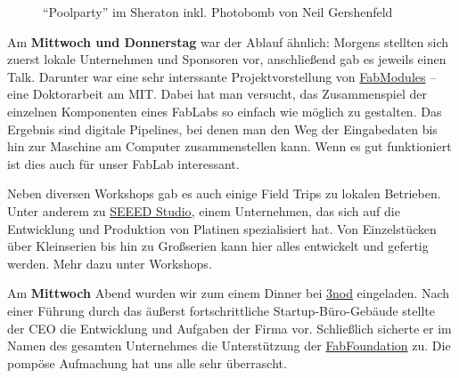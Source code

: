 \documentclass{\basedir/fablab-document}
\begin{document}
\begin{figure}[h]
	\noindent{}
	\caption{``Poolparty'' im Sheraton inkl. Photobomb von Neil Gershenfeld}
	\label{photobomb-neil}
\end{figure}

Am \textbf{Mittwoch und Donnerstag} war der Ablauf ähnlich: Morgens
stellten sich zuerst lokale Unternehmen und Sponsoren vor, anschließend
gab es jeweils einen Talk. Darunter war eine sehr interssante
Projektvorstellung von \href{http://fabmodules.org/}{FabModules} -- eine
Doktorarbeit am MIT. Dabei hat man versucht, das Zusammenspiel der
einzelnen Komponenten eines FabLabs so einfach wie möglich zu gestalten.
Das Ergebnis sind digitale Pipelines, bei denen man den Weg der
Eingabedaten bis hin zur Maschine am Computer zusammenstellen kann. Wenn
es gut funktioniert ist dies auch für unser FabLab interessant.

Neben diversen Workshops gab es auch einige Field Trips zu lokalen
Betrieben. Unter anderem zu \href{https://www.seeedstudio.com/}{SEEED
Studio}, einem Unternehmen, das sich auf die Entwicklung und Produktion
von Platinen spezialisiert hat. Von Einzelstücken über Kleinserien bis
hin zu Großserien kann hier alles entwickelt und gefertig werden. Mehr
dazu unter Workshops.

Am \textbf{Mittwoch} Abend wurden wir zum einem Dinner bei 
\href{https://www.3nod.com.cn/en/}{3nod} eingeladen. Nach einer
Führung durch das äußerst fortschrittliche Startup-Büro-Gebäude stellte
der CEO die Entwicklung und Aufgaben der Firma vor.
Schließlich sicherte er im Namen des gesamten Unternehmes die
Unterstützung der \href{https://fabfoundation.org/}{FabFoundation} zu.
Die pompöse Aufmachung hat uns alle sehr überrascht.
\end{document}
